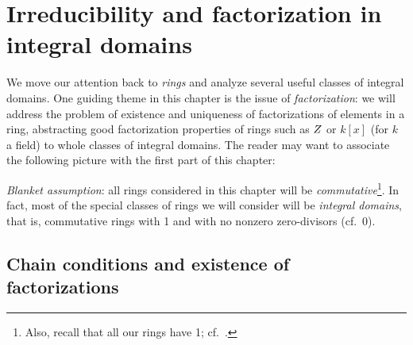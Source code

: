 \chapter{Irreducibility and factorization in integral domains}
\label{chap:irred}

We move our attention back to \emph{rings} and analyze several useful
classes of integral domains.  One guiding theme in this chapter is the
issue of \emph{factorization}: we will address the problem of
existence and uniqueness of factorizations of elements in a ring,
abstracting good factorization properties of rings such as $Z$ or
$k[x]$ (for $k$ a field) to whole classes of integral domains.  The
reader may want to associate the following picture with the first part
of this chapter:


\begin{center}
\end{center}

\emph{Blanket assumption}: all rings considered in this chapter will
be \emph{commutative}\footnote{Also, recall that all our rings have 1;
  cf.\ .}.  In fact, most of the special classes
of rings we will consider will be \emph{integral domains}, that is,
commutative rings with 1 and with no nonzero zero-divisors (cf.\
0).

\section{Chain conditions and existence of factorizations}
\label{sec:irred:chain-conditions-and-existence-of-factorizations}


